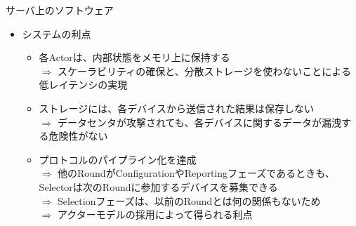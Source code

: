 \documentclass[dvipdfmx,notheorems,t]{beamer}
\begin{document}
\begin{frame}{サーバ上のソフトウェア}

\begin{itemize}
	\item システムの利点
	\begin{itemize}
		\item 各Actorは、内部状態をメモリ上に保持する \\
		$\Rightarrow$ スケーラビリティの確保と、分散ストレージを使わないことによる低レイテンシの実現
		\newline
		
		\item ストレージには、各デバイスから送信された結果は保存しない \\
		$\Rightarrow$ データセンタが攻撃されても、各デバイスに関するデータが漏洩する危険性がない
		\newline
		
		\item プロトコルのパイプライン化を達成 \\
		$\Rightarrow$ 他のRoundがConfigurationやReportingフェーズであるときも、Selectorは次のRoundに参加するデバイスを募集できる \\
		$\Rightarrow$ Selectionフェーズは、以前のRoundとは何の関係もないため \\
		$\Rightarrow$ アクターモデルの採用によって得られる利点
	\end{itemize}
\end{itemize}

\end{frame}
\end{document}
